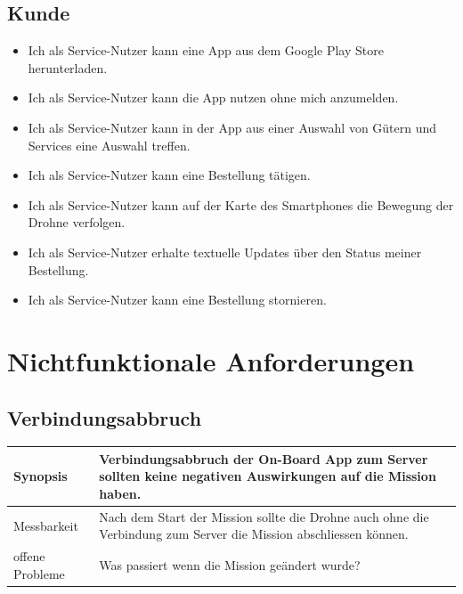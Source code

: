 \subsection{Kunde}
\begin{itemize}
\item Ich als Service-Nutzer kann eine App aus dem Google Play Store herunterladen.
\item Ich als Service-Nutzer kann die App nutzen ohne mich anzumelden.
\item Ich als Service-Nutzer kann in der App aus einer Auswahl von Gütern und Services eine Auswahl treffen.
\item Ich als Service-Nutzer kann eine Bestellung tätigen.
\item Ich als Service-Nutzer kann auf der Karte des Smartphones die Bewegung der Drohne verfolgen.
\item Ich als Service-Nutzer erhalte textuelle Updates über den Status meiner Bestellung.
\item Ich als Service-Nutzer kann eine Bestellung stornieren.
\end{itemize}

\section{Nichtfunktionale Anforderungen}


\subsection{Verbindungsabbruch}
\begin{tabular}{|p{}|p{}|} \hline
	Synopsis & Verbindungsabbruch der On-Board App zum Server sollten keine negativen Auswirkungen auf die Mission haben.  \\ \hline
		
	Messbarkeit & Nach dem Start der Mission sollte die Drohne auch ohne die Verbindung zum Server die Mission abschliessen können. \\ \hline
	
	offene Probleme & Was passiert wenn die Mission geändert wurde? \\ \hline
\end{tabular}

